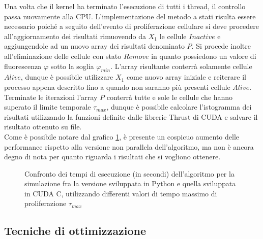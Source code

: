 Una volta che il kernel ha terminato l'esecuzione di tutti i thread, il
controllo passa nuovamente alla CPU.
L'implementazione del metodo a stati risulta essere necessario poiché a seguito
dell'evento di proliferazione cellulare
si deve procedere all'aggiornamento dei risultati rimuovendo
da $X_{1}$ le cellule $Inactive$ e aggiungendole ad un nuovo array dei
risultati denominato $P$.
Si procede inoltre all'eliminazione delle cellule con stato $Remove$ in quanto
possiedono un valore di fluorescenza $\varphi$ sotto la soglia $\varphi_{min}$.
L'array risultante conterrà solamente cellule $Alive$, dunque è possibile
utilizzare $X_{1}$ come nuovo array iniziale e reiterare
il processo appena descritto fino a quando non saranno più presenti cellule
$Alive$.
Terminate le iterazioni l'array $P$ conterrà tutte e sole le cellule che hanno
superato il limite temporale $\tau_{max}$, dunque è possibile calcolare
l'istogramma dei risultati utilizzando la funzioni definite dalle librerie
Thrust\cite{bell2011thrust} di CUDA e salvare il risultato ottenuto
su file.
\\
Come è possibile notare dal grafico \ref{chart:python-cuda}, è presente un
cospicuo aumento delle performance
rispetto alla versione non parallela dell'algoritmo, ma non è ancora degno
di nota per quanto riguarda i risultati che si vogliono ottenere.
\begin{figure}[t]
    \centering
    \caption{Confronto dei tempi di esecuzione (in secondi) dell'algoritmo per
        la simulazione fra la versione sviluppata in Python e quella sviluppata
        in CUDA C, utilizzando differenti valori di tempo massimo di
        proliferazione $\tau_{max}$}
    \label{chart:python-cuda}
\end{figure}

\subsection{Tecniche di ottimizzazione}

